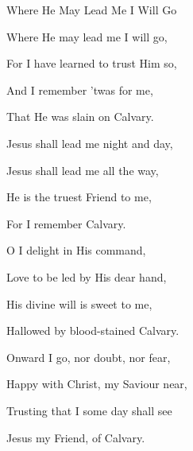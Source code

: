 \documentclass[12pt]{book}
\begin{document}
\begin{song}{Where He May Lead Me I Will Go}{}
  {\SBPubDom}
  {}
  {}
  {}

  \begin{SBVerse}
    Where He may lead me I will go,

    For I have learned to trust Him so,

    And I remember 'twas for me,

    That He was slain on Calvary.
  \end{SBVerse}

  \begin{SBOpGroup}
    Jesus shall lead me night and day,

    Jesus shall lead me all the way,

    He is the truest Friend to me,

    For I remember Calvary.
  \end{SBOpGroup}

  \begin{SBVerse}
    O I delight in His command,

    Love to be led by His dear hand,

    His divine will is sweet to me,

    Hallowed by blood-stained Calvary.
  \end{SBVerse}

  \begin{SBVerse}
    Onward I go, nor doubt, nor fear,

    Happy with Christ, my Saviour near,

    Trusting that I some day shall see

    Jesus my Friend, of Calvary.
  \end{SBVerse}
\end{song}
\end{document}
